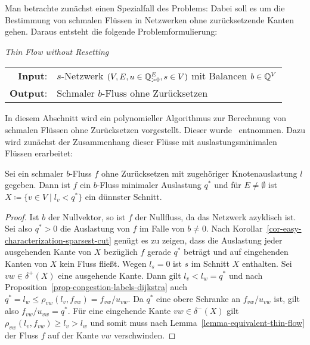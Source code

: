 Man betrachte zunächst einen Spezialfall des Problems:
Dabei soll es um die Bestimmung von schmalen Flüssen in Netzwerken ohne zurücksetzende Kanten gehen.
Daraus entsteht die folgende Problemformulierung:

\begin{center}
	\begin{mdframed}
		\centering
		\emph{Thin Flow without Resetting \probTFwoR} \\[1em]
		\begin{tabular}{rl}
			{\bfseries Input}: &$s$-Netzwerk $(V, E, u \in \mathbb{Q}^E_{>0}, s\in V)$ mit Balancen $b\in\mathbb{Q}^V$\\
			{\bfseries Output}: &Schmaler $b$-Fluss ohne Zurücksetzen
		\end{tabular}
	\end{mdframed}
\end{center}

In diesem Abschnitt wird ein polynomieller Algorithmus zur Berechnung von schmalen Flüssen ohne Zurücksetzen vorgestellt.
Dieser wurde~\cite{Koch2012} entnommen.
Dazu wird zunächst der Zusammenhang dieser Flüsse mit auslastungsminimalen Flüssen erarbeitet:

\begin{lemma}\label{lemma-thin-flows-without-resetting-have-minimal-congestion}
	Sei ein schmaler $b$-Fluss $f$ ohne Zurücksetzen mit zugehöriger Knotenauslastung $l$ gegeben.
	Dann ist $f$ ein $b$-Fluss minimaler Auslastung $q^*$ und für $E\neq\emptyset$ ist $X\coloneq \{ v\in V \mid l_v < q^* \}$ ein dünnster Schnitt.
\end{lemma}
\begin{proof}
	Ist $b$ der Nullvektor, so ist $f$ der Nullfluss, da das Netzwerk azyklisch ist.
	Sei also $q^*>0$ die Auslastung von $f$ im Falle von $b\neq 0$.
	Nach Korollar~\ref{cor-easy-characterization-sparsest-cut} genügt es zu
	zeigen, dass die Auslastung jeder ausgehenden Kante von $X$ bezüglich $f$ gerade $q^*$ beträgt und auf eingehenden Kanten von $X$ kein Fluss fließt.
	Wegen $l_s=0$ ist $s$ im Schnitt $X$ enthalten.
	Sei $vw\in\delta^+(X)$ eine ausgehende Kante.
	Dann gilt $l_v < l_w = q^* $ und nach Proposition~\ref{prop-congestion-labels-dijkstra} auch $q^* = l_w \leq \rho_{vw}(l_v, f_{vw}) = f_{vw} / u_{vw}$.
	Da $q^*$ eine obere Schranke an $f_{vw}/u_{vw}$ ist, gilt also $f_{vw}/u_{vw} = q^*$.
	Für eine eingehende Kante $vw\in\delta^-(X)$ gilt $\rho_{vw}(l_v, f_{vw})\geq l_v > l_w$ und somit muss nach Lemma~\ref{lemma-equivalent-thin-flow} der Fluss $f$ auf der Kante $vw$ verschwinden.
\end{proof}

